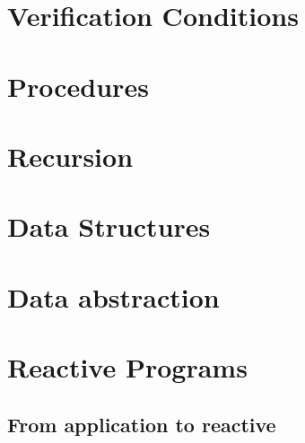 \documentclass[12pt, a4paper]{book}
\begin{document}
  \section{Verification Conditions}
  \label{sec:Verification Conditions}
  \section{Procedures}
  \label{sec:Procedures}

  \section{Recursion}
  \label{sec:Recursion}

  \section{Data Structures}
  \label{sec:Data Structures}

  \section{Data abstraction}
  \label{sec:Data abstraction}


  \section{Reactive Programs}
  \label{sec:Reactive Programs}
  \subsection{From application to reactive}
  \label{sub:From application to reactive}
\end{document}
